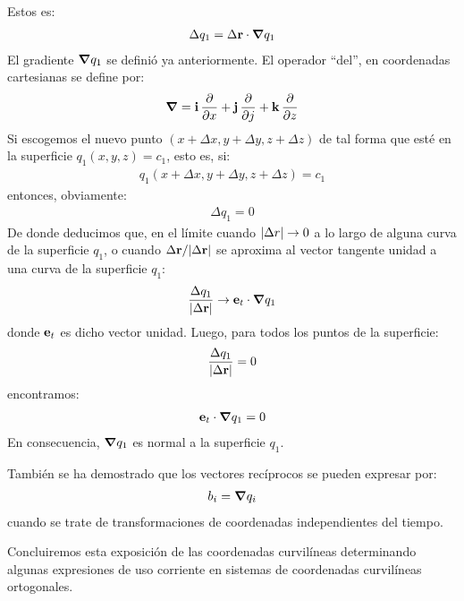 Estos es:
\begin{align}
    \Delta q_{1} = \Delta \vb{r} \cdot \grad{q_{1}}
    \label{eq:ecuacion_02_88}
\end{align}
El gradiente $\grad{q_{1}}$ se definió ya anteriormente. El operador \enquote{del}, en coordenadas cartesianas se define por:
\begin{align}
    \grad = \vb{i} \, \pdv{x} + \vb{j} \, \pdv{j} + \vb{k} \, \pdv{z}
    \label{ec:ecuacion_02_89}
\end{align}
Si escogemos el nuevo punto $(x + \Delta x, y + \Delta y, z + \Delta z)$ de tal forma que esté en la superficie $q_{1} (x, y, z) = c_{1}$, esto es, si:
\begin{align*}
    q_{1} \left( x + \Delta x, y + \Delta y, z + \Delta z \right) = c_{1}
\end{align*}
entonces, obviamente:
\begin{align*}
    \Delta q_{1} = 0
\end{align*}
De donde deducimos que, en el límite cuando $\abs{\Delta r} \to 0$ a lo largo de alguna curva de la superficie $q_{1}$, o cuando $\Delta \vb{r} / \abs{\Delta \vb{r}}$ se aproxima al vector tangente unidad a una curva de la superficie $q_{1}$: 
\begin{align*}
    \dfrac{\Delta q_{1}}{\abs{\Delta \vb{r}}} \to \vb{e}_{t} \cdot \grad{q_{1}}
\end{align*}
donde $\vb{e}_{t}$ es dicho vector unidad. Luego, para todos los puntos de la superficie:
\begin{align*}
    \dfrac{\Delta q_{1}}{\abs{\Delta \vb{r}}} = 0
\end{align*}
encontramos:
\begin{align*}
    \vb{e}_{t} \cdot \grad{q_{1}} = 0
\end{align*}
En consecuencia, $\grad{q_{1}}$ es normal a la superficie $q_{1}$.
\par
También se ha demostrado que los vectores recíprocos se pueden expresar por:
\begin{align*}
    b_{i} = \grad{q_{i}}
\end{align*}
cuando se trate de transformaciones de coordenadas independientes del tiempo.
\par
Concluiremos esta exposición de las coordenadas curvilíneas determinando algunas expresiones de uso corriente en sistemas de coordenadas curvilíneas ortogonales. 
